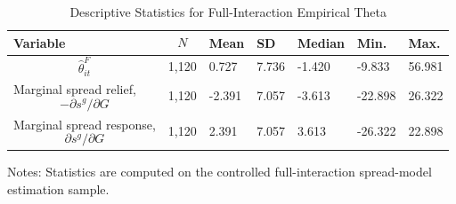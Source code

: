 \begin{table}[H]\centering
\begin{threeparttable}
\caption{Descriptive Statistics for Full-Interaction Empirical Theta}
\label{tab:theta_descriptive_stats}
\scriptsize
\begin{tabularx}{\textwidth}{lYYYYYY}
\toprule
Variable & $$N$$ & Mean & SD & Median & Min. & Max. \\
\midrule
$$\widehat{\theta}^{F}_{it}$$ & 1,120 & 0.727 & 7.736 & -1.420 & -9.833 & 56.981 \\
Marginal spread relief, $$-\partial s^g/\partial G$$ & 1,120 & -2.391 & 7.057 & -3.613 & -22.898 & 26.322 \\
Marginal spread response, $$\partial s^g/\partial G$$ & 1,120 & 2.391 & 7.057 & 3.613 & -26.322 & 22.898 \\
\bottomrule
\end{tabularx}
\begin{tablenotes}[flushleft]\footnotesize
\item Notes: Statistics are computed on the controlled full-interaction spread-model estimation sample.
\end{tablenotes}
\end{threeparttable}
\end{table}
